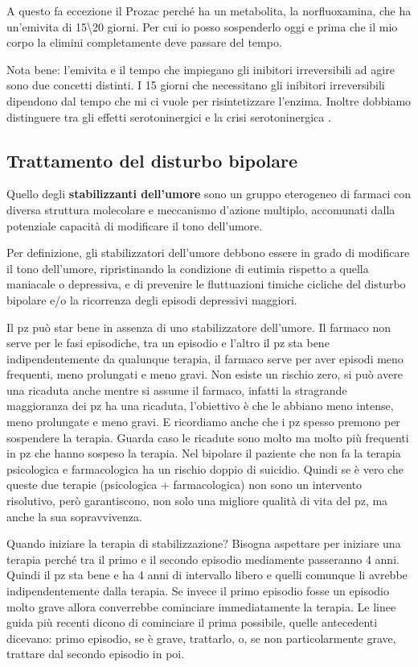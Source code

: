 A questo fa eccezione il Prozac perché ha un metabolita, la
norfluoxamina, che ha un'emivita di 15\textbackslash{}20 giorni. Per cui
io posso sospenderlo oggi e prima che il mio corpo la elimini
completamente deve passare del tempo.

Nota bene: l'emivita e il tempo che impiegano gli inibitori
irreversibili ad agire sono due concetti distinti. I 15 giorni che
necessitano gli inibitori irreversibili dipendono dal tempo che mi ci
vuole per risintetizzare l'enzima. Inoltre dobbiamo distinguere tra gli
effetti serotoninergici e la crisi serotoninergica .

\subsection{Trattamento del disturbo bipolare}

Quello degli \textbf{stabilizzanti dell'umore} sono un gruppo eterogeneo
di farmaci con diversa struttura molecolare e meccanismo d'azione
multiplo, accomunati dalla potenziale capacità di modificare il tono
dell'umore.

Per definizione, gli stabilizzatori dell'umore debbono essere in grado
di modificare il tono dell'umore, ripristinando la condizione di eutimia
rispetto a quella maniacale o depressiva, e di prevenire le fluttuazioni
timiche cicliche del disturbo bipolare e/o la ricorrenza degli episodi
depressivi maggiori.

Il pz può star bene in assenza di uno stabilizzatore dell'umore. Il
farmaco non serve per le fasi episodiche, tra un episodio e l'altro il
pz sta bene indipendentemente da qualunque terapia, il farmaco serve per
aver episodi meno frequenti, meno prolungati e meno gravi. Non esiste un
rischio zero, si può avere una ricaduta anche mentre si assume il
farmaco, infatti la stragrande maggioranza dei pz ha una ricaduta,
l'obiettivo è che le abbiano meno intense, meno prolungate e meno gravi.
E ricordiamo anche che i pz spesso premono per sospendere la terapia.
Guarda caso le ricadute sono molto ma molto più frequenti in pz che
hanno sospeso la terapia. Nel bipolare il paziente che non fa la terapia
psicologica e farmacologica ha un rischio doppio di suicidio. Quindi se
è vero che queste due terapie (psicologica + farmacologica) non sono un
intervento risolutivo, però garantiscono, non solo una migliore qualità
di vita del pz, ma anche la sua sopravvivenza.

Quando iniziare la terapia di stabilizzazione? Bisogna aspettare per
iniziare una terapia perché tra il primo e il secondo episodio
mediamente passeranno 4 anni. Quindi il pz sta bene e ha 4 anni di
intervallo libero e quelli comunque li avrebbe indipendentemente dalla
terapia. Se invece il primo episodio fosse un episodio molto grave
allora converrebbe cominciare immediatamente la terapia. Le linee guida
più recenti dicono di cominciare il prima possibile, quelle antecedenti
dicevano: primo episodio, se è grave, trattarlo, o, se non
particolarmente grave, trattare dal secondo episodio in poi.

